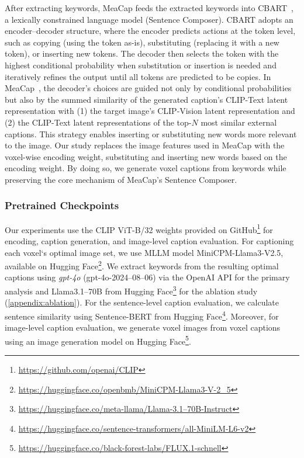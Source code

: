 After extracting keywords, MeaCap feeds the extracted keywords into CBART~\cite{he2021parallel}, a lexically constrained language model (Sentence Composer). CBART adopts an encoder–decoder structure, where the encoder predicts actions at the token level, such as copying (using the token as-is), substituting (replacing it with a new token), or inserting new tokens. The decoder then selects the token with the highest conditional probability when substitution or insertion is needed and iteratively refines the output until all tokens are predicted to be copies. In MeaCap~\cite{zeng2024meacap}, the decoder’s choices are guided not only by conditional probabilities but also by the summed similarity of the generated caption’s CLIP-Text latent representation with (1) the target image’s CLIP-Vision latent representation and (2) the CLIP-Text latent representations of the top-$N$ most similar external captions. This strategy enables inserting or substituting new words more relevant to the image. Our study replaces the image features used in MeaCap with the voxel-wise encoding weight, substituting and inserting new words based on the encoding weight. By doing so, we generate voxel captions from keywords while preserving the core mechanism of MeaCap’s Sentence Composer.


\subsubsection{Pretrained Checkpoints}
\label{appendix:pretrained_ckpts}
Our experiments use the CLIP ViT-B/32 weights provided on GitHub\footnote{\href{https://github.com/openai/CLIP}{https://github.com/openai/CLIP}} for encoding, caption generation, and image-level caption evaluation. For captioning each voxel‘s optimal image set, we use MLLM model MiniCPM-Llama3-V2.5, available on Hugging Face\footnote{\href{https://huggingface.co/openbmb/MiniCPM-Llama3-V-2_5}{https://huggingface.co/openbmb/MiniCPM-Llama3-V-2\_5}}. We extract keywords from the resulting optimal captions using \textit{gpt-4o} (gpt-4o-2024–08–06) via the OpenAI API for the primary analysis and Llama3.1–70B from Hugging Face\footnote{\href{https://huggingface.co/meta-llama/Llama-3.1–70B-Instruct}{https://huggingface.co/meta-llama/Llama-3.1–70B-Instruct}} for the ablation study (\ref{appendix:ablation}). For the sentence-level caption evaluation, we calculate sentence similarity using Sentence-BERT from Hugging Face\footnote{\href{https://huggingface.co/sentence-transformers/all-MiniLM-L6-v2}{https://huggingface.co/sentence-transformers/all-MiniLM-L6-v2}}. Moreover, for image-level caption evaluation, we generate voxel images from voxel captions using an image generation model on Hugging Face\footnote{\href{https://huggingface.co/black-forest-labs/FLUX.1-schnell}{https://huggingface.co/black-forest-labs/FLUX.1-schnell}}.

